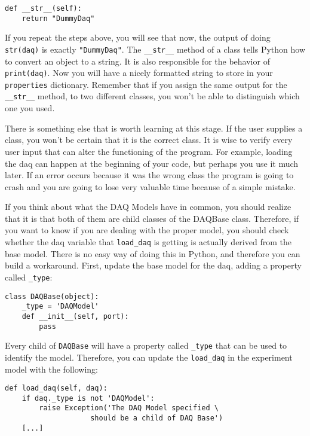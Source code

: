 {\begin{verbatim}
def __str__(self):
    return "DummyDaq"
\end{verbatim}

If you repeat the steps above, you will see that now, the output of
doing \texttt{str(daq)} is exactly \texttt{"DummyDaq"}. The
\texttt{__str__} method of a class tells Python how to convert an
object to a string. It is also responsible for the behavior of
\texttt{print(daq)}. Now you will have a nicely formatted string to
store in your \texttt{properties} dictionary. Remember that if you
assign the same output for the \texttt{__str__} method, to two
different classes, you won't be able to distinguish which one you used.

There is something else that is worth learning at this stage. If the
user supplies a class, you won't be certain that it is the correct
class. It is wise to verify every user input that can alter the
functioning of the program. For example, loading the daq can happen at
the beginning of your code, but perhaps you use it much later. If an
error occurs because it was the wrong class the program is going to
crash and you are going to lose very valuable time because of a
simple mistake.

If you think about what the {DAQ} Models have in common, you should
realize that it is that both of them are child classes of the DAQBase
class. Therefore, if you want to know if you are dealing with the proper
model, you should check whether the daq variable that \texttt{load_daq}
is getting is actually derived from the base model. There is no easy way
of doing this in Python, and therefore you can build a workaround.
First, update the base model for the daq, adding a property called
\texttt{_type}:

\begin{verbatim}
class DAQBase(object):
    _type = 'DAQModel'
    def __init__(self, port):
        pass
\end{verbatim}

Every child of \texttt{DAQBase} will have a property called
\texttt{_type} that can be used to identify the model. Therefore, you
can update the \texttt{load_daq} in the experiment model with
the following:

\begin{verbatim}
def load_daq(self, daq):
    if daq._type is not 'DAQModel':
        raise Exception('The DAQ Model specified \
                    should be a child of DAQ Base')
    [...]
\end{verbatim}

}
